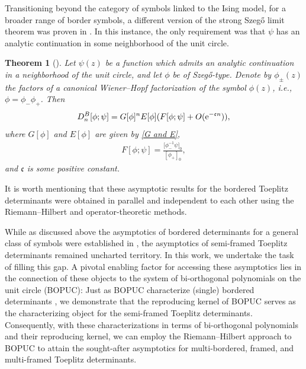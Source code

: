 \documentclass[pdftex]{sigma}
\numberwithin{equation}{section}
\newtheorem{Theorem}{Theorem}[section]
\newcommand{\T}{{\mathbb T}}
\begin{document}
	
	Transitioning beyond the category of symbols linked to the Ising model, for a broader range of border symbols, a different version of the strong Szeg\H{o} limit theorem was proven in \cite{BEGIL}. In this instance, the only requirement was that $\psi$ has an analytic continuation in some neighborhood of the unit circle.
	\begin{Theorem}[\cite{BEGIL}]\label{thm 1.2}
		Let $\psi(z)$ be a function which admits an analytic continuation in a neighborhood of the unit circle, and let
		$\phi$ be of Szeg\H{o}-type. Denote by $\phi_{\pm}(z)$ the factors of a canonical Wiener--Hopf factorization of the symbol
		$\phi(z)$, i.e., $\phi=\phi_-\phi_+$. Then
		\begin{gather*}%
			D^B_{n}[\phi ; \psi ] =
			G[\phi]^{n} E[\phi]( F[\phi;\psi] + O({\rm e}^{-\mathfrak{c}n})),
		\end{gather*}
		where $G[\phi]$ and $E[\phi]$ are given by \eqref{G and E},
		\begin{gather*}%
			F[\phi;\psi]=\frac{\big[\phi_-^{-1}\psi\big]_0}{[\phi_+]_0},
		\end{gather*}
		and $\mathfrak{c}$ is some positive constant.
	\end{Theorem}	
	It is worth mentioning that	these asymptotic results for the bordered Toeplitz determinants were obtained in parallel and independent to each other using the Riemann--Hilbert and operator-theoretic methods.
	
	
	
	While as discussed above the asymptotics of bordered determinants for a general class of symbols were established in \cite{BEGIL}, the asymptotics of semi-framed Toeplitz determinants remained uncharted territory. In this work, we undertake the task of filling this gap. A pivotal enabling factor for accessing these asymptotics lies in the connection of these objects to the system of bi-orthogonal polynomials on the unit circle (BOPUC): Just as BOPUC characterize (single) bordered determinants \cite{BEGIL}, we demonstrate that the reproducing kernel of BOPUC serves as the characterizing object for the semi-framed Toeplitz determinants. Consequently, with these characterizations in terms of bi-orthogonal polynomials and their reproducing kernel, we can employ the Riemann--Hilbert approach to BOPUC \cite{BDJ} to attain the sought-after asymptotics for multi-bordered, framed, and multi-framed Toeplitz determinants.
	
\end{document}
